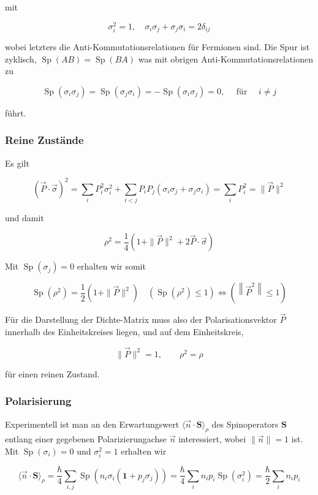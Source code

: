 \documentclass[10pt, letterpaper]{article}
\begin{document}
mit

$$
\sigma_{i}^{2}=1, \quad \sigma_{i} \sigma_{j}+\sigma_{j} \sigma_{i}=2 \delta_{i j}
$$

wobei letzters die Anti-Kommutationsrelationen für Fermionen sind. Die Spur ist zyklisch, $\operatorname{Sp}(A B)=\operatorname{Sp}(B A)$ was mit obrigen Anti-Kommutationsrelationen zu

$$
\operatorname{Sp}\left(\sigma_{i} \sigma_{j}\right)=\operatorname{Sp}\left(\sigma_{j} \sigma_{i}\right)=-\operatorname{Sp}\left(\sigma_{i} \sigma_{j}\right)=0, \quad \text { für } \quad i \neq j
$$

führt.

\subsubsection*{Reine Zustände}
Es gilt

$$
(\vec{P} \cdot \vec{\sigma})^{2}=\sum_{i} P_{i}^{2} \sigma_{i}^{2}+\sum_{i<j} P_{i} P_{j}\left(\sigma_{i} \sigma_{j}+\sigma_{j} \sigma_{i}\right)=\sum_{i} P_{i}^{2}=\|\vec{P}\|^{2}
$$

und damit

$$
\rho^{2}=\frac{1}{4}\left(1+\|\vec{P}\|^{2}+2 \vec{P} \cdot \vec{\sigma}\right)
$$

Mit $\operatorname{Sp}\left(\sigma_{j}\right)=0$ erhalten wir somit

$$
\operatorname{Sp}\left(\rho^{2}\right)=\frac{1}{2}\left(1+\|\vec{P}\|^{2}\right) \quad\left(\operatorname{Sp}\left(\rho^{2}\right) \leq 1\right) \Leftrightarrow\left(\left\|\vec{P}^{2}\right\| \leq 1\right)
$$

Für die Darstellung der Dichte-Matrix muss also der Polarisationsvektor $\vec{P}$ innerhalb des Einheitskreises liegen, und auf dem Einheitskreis,

$$
\|\vec{P}\|^{2}=1, \quad \quad \rho^{2}=\rho
$$

für einen reinen Zustand.

\subsubsection*{Polarisierung}
Experimentell ist man an den Erwartungswert $\langle\vec{n} \cdot \mathbf{S}\rangle_{\rho}$ des Spinoperators $\mathbf{S}$ entlang einer gegebenen Polarizierungachse $\vec{n}$ interessiert, wobei $\|\vec{n}\|=1$ ist. Mit $\operatorname{Sp}\left(\sigma_{i}\right)=0$ und $\sigma_{i}^{2}=1$ erhalten wir

$$
\langle\vec{n} \cdot \mathbf{S}\rangle_{\rho}=\frac{\hbar}{4} \sum_{i, j} \operatorname{Sp}\left(n_{i} \sigma_{i}\left(\mathbf{1}+p_{j} \sigma_{j}\right)\right)=\frac{\hbar}{4} \sum_{i} n_{i} p_{i} \operatorname{Sp}\left(\sigma_{i}^{2}\right)=\frac{\hbar}{2} \sum_{i} n_{i} p_{i}
$$
\end{document}
